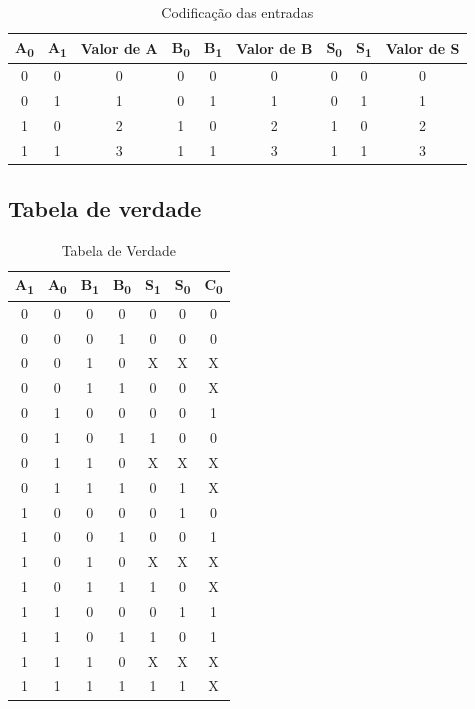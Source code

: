 \documentclass[a4paper,12pt]{article}
\begin{document}
\begin{table}[h]
\centering
\begin{tabular}{|| c | c | c || c | c | c || c | c | c ||}
\hline
A\textsubscript{0} & A\textsubscript{1} & Valor de A & B\textsubscript{0} & B\textsubscript{1} & Valor de B & S\textsubscript{0} & S\textsubscript{1} & Valor de S \\ \hline
0 & 0 & 0 & 0 & 0 & 0 & 0 & 0 & 0  \\
0 & 1 & 1 & 0 & 1 & 1 & 0 & 1 & 1 \\
1 & 0 & 2 & 1 & 0 & 2 & 1 & 0 & 2 \\
1 & 1 & 3 & 1 & 1 & 3 & 1 & 1 & 3 \\ \hline
\end{tabular}
\caption{Codificação das entradas} %
\end{table}

\subsection{Tabela de verdade}
 
\begin{table}[h]

\centering
\begin{tabular}{ || c  c | c c || c c| c || }
\hline
A\textsubscript{1} & A\textsubscript{0} & B\textsubscript{1} & B\textsubscript{0} & S\textsubscript{1} & S\textsubscript{0} & C\textsubscript{0} \\ \hline
0   & 0  & 0  & 0  & 0  & 0  & 0  \\ \hline
0   & 0  & 0  & 1  & 0  & 0  & 0  \\ \hline
0   & 0  & 1  & 0  & X  & X  & X  \\ \hline
0   &  0  & 1   & 1   & 0   & 0   & X   \\ \hline
0   &  1  &  0  & 0   & 0   & 0   & 1   \\ \hline
0   &  1  &  0  & 1   & 1   & 0   & 0   \\ \hline
0   &  1  &  1  & 0   & X   & X   & X   \\ \hline
0   &  1  &  1  & 1   & 0   & 1   & X   \\ \hline
1   &  0  &  0  & 0   & 0   & 1   & 0   \\ \hline
1   &  0  &  0  & 1   & 0   & 0   & 1   \\ \hline
1   &  0  &  1  & 0   & X   & X   & X   \\ \hline
1   &  0  &  1  & 1   & 1   & 0   & X   \\ \hline
1   &  1  &  0  & 0   & 0   & 1   & 1   \\ \hline
1   &  1  &  0  & 1   & 1   & 0   & 1   \\ \hline
1   &  1  &  1  & 0   & X   & X   & X   \\ \hline
1   &  1  &  1  & 1   & 1   & 1   & X   \\ \hline
\end{tabular}
\caption{Tabela de Verdade} %
\end{table}
\end{document}

